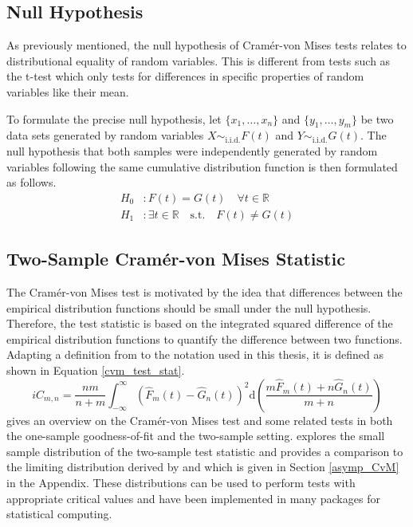 \documentclass[12pt, a4paper]{article}
\theoremstyle{MAstyle} \newtheorem{assumption}{Assumption}[section]
\theoremstyle{MAstyle} \newtheorem{definition}{Definition}[section]
\theoremstyle{MAstyle} \newtheorem{theorem}{Theorem}[section]
\begin{document}
		
		\subsection{Null Hypothesis}
			As previously mentioned, the null hypothesis of Cram\'{e}r-von Mises tests relates to distributional equality of random variables. This is different from tests such as the t-test which only tests for differences in specific properties of random variables like their mean.
			
			To formulate the precise null hypothesis, let $\{x_1, \dots , x_n\}$ and $\{y_1, \dots , y_m\}$ be two data sets generated by random variables $X \sim_{\text{i.i.d.}} F(t)$ and $Y \sim_{\text{i.i.d.}} G(t)$.
			The null hypothesis that both samples were independently generated by random variables following the same cumulative distribution function is then formulated as follows.
			\begin{equation}
				\begin{split}
					H_0&: F(t) = G(t) \quad \forall t \in \mathbb{R}\\
					H_1&: \exists t \in \mathbb{R} \quad \text{s.t.} \quad F(t) \neq G(t)
				\end{split}
			\end{equation}
				
			
		\subsection{Two-Sample Cram\'{e}r-von Mises Statistic}\label{Two_sample_CvM}
			The Cram\'{e}r-von Mises test is motivated by the idea that differences between the empirical distribution functions should be small under the null hypothesis. Therefore, the test statistic is based on the integrated squared difference of the empirical distribution functions to quantify the difference between two functions.
			Adapting a definition from \cite{buning_nichtparametrische_2013} to the notation used in this thesis, it is defined as shown in Equation \ref{cvm_test_stat}.
			\begin{equation}\label{cvm_test_stat}i
				C_{m,n} = \frac{nm}{n+m} \int_{-\infty}^{\infty}\left(\hat{F}_{m}(t) - \hat{G}_{n}(t)\right)^{2} \mathrm{d} \left(\frac{m \hat{F}_{m}(t) + n \hat{G}_{n}(t)}{m+n}\right)
			\end{equation}
			\cite{darling_kolmogorov-smirnov_1957} gives an overview on the Cram\'{e}r-von Mises test and some related tests in both the one-sample goodness-of-fit and the two-sample setting. \cite{anderson_distribution_1962} explores the small sample distribution of the two-sample test statistic and provides a comparison to the limiting distribution derived by \cite{rosenblatt_limit_1952} and \cite{fisz_result_1960} which is given in Section \ref{asymp_CvM} in the Appendix. These distributions can be used to perform tests with appropriate critical values and have been implemented in many packages for statistical computing.\\
			
\end{document}
